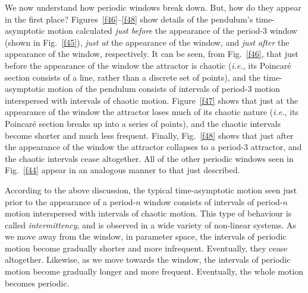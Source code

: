 We now understand how periodic windows break down. But, how do they appear in the
first place? Figures~\ref{f46}--\ref{f48} show details of the pendulum's time-asymptotic
motion calculated {\em just before} the appearance of the period-3 window (shown in Fig.~\ref{f45}), {\em just at} the appearance of the window, and {\em just after} the appearance of the window,
respectively. It can be seen, from Fig.~\ref{f46}, that just before the appearance of the
window the attractor is chaotic ({\em i.e.}, its Poincar\'e section consists of a line,
rather than a discrete set of points), and the time-asymptotic motion of the pendulum
consists of intervals of period-3 motion interspersed with intervals of chaotic motion.
Figure~\ref{f47} shows that just at the appearance of the window the attractor
loses much of its chaotic nature ({\em i.e.}, its Poincar\'e section  breaks up into a series 
of points), and the chaotic intervals  become shorter and much less frequent. Finally,
Fig.~\ref{f48} shows that just after the appearance of the window the attractor
collapses to a period-3 attractor, and the chaotic intervals cease altogether. 
All of the other periodic windows seen in Fig.~\ref{f44} appear in an analogous manner to that
just described.

According to the above discussion,
the typical time-asymptotic motion seen just prior to the appearance of a period-$n$ window
consists of intervals of period-$n$ motion interspersed with intervals of chaotic
motion. This type of behaviour is called {\em intermittency}, and is observed in a
wide variety of non-linear systems. As we move away from the window, in parameter
space, the intervals of periodic motion become gradually shorter and more infrequent. 
Eventually, they cease altogether. Likewise, as we move towards the window, the
intervals of periodic motion become gradually longer and more frequent. Eventually,
the whole motion becomes periodic. 

